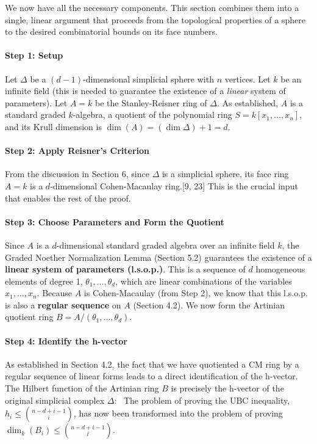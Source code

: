 \documentclass[11pt]{article}
\begin{document}
We now have all the necessary components. This section combines them into a single, linear argument that proceeds from the topological properties of a sphere to the desired combinatorial bounds on its face numbers.

\paragraph{Step 1: Setup}
Let $\Delta$ be a $(d-1)$-dimensional simplicial sphere with $n$ vertices. Let $k$ be an infinite field (this is needed to guarantee the existence of a \textit{linear} system of parameters). Let $A = k$ be the Stanley-Reisner ring of $\Delta$. As established, $A$ is a standard graded $k$-algebra, a quotient of the polynomial ring $S = k[x_1, \ldots, x_n]$, and its Krull dimension is $\dim(A) = (\dim \Delta) + 1 = d$.

\paragraph{Step 2: Apply Reisner's Criterion}
From the discussion in Section 6, since $\Delta$ is a simplicial sphere, its face ring $A = k$ is a $d$-dimensional Cohen-Macaulay ring.[9, 23] This is the crucial input that enables the rest of the proof.

\paragraph{Step 3: Choose Parameters and Form the Quotient}
Since $A$ is a $d$-dimensional standard graded algebra over an infinite field $k$, the Graded Noether Normalization Lemma (Section 5.2) guarantees the existence of a \textbf{linear system of parameters (l.s.o.p.)}. This is a sequence of $d$ homogeneous elements of degree 1, $\theta_1, \ldots, \theta_d$, which are linear combinations of the variables $x_1, \ldots, x_n$.
Because $A$ is Cohen-Macaulay (from Step 2), we know that this l.s.o.p. is also a \textbf{regular sequence} on $A$ (Section 4.2).
We now form the Artinian quotient ring $B = A / (\theta_1, \ldots, \theta_d)$.

\paragraph{Step 4: Identify the h-vector}
As established in Section 4.2, the fact that we have quotiented a CM ring by a regular sequence of linear forms leads to a direct identification of the h-vector. The Hilbert function of the Artinian ring $B$ is precisely the h-vector of the original simplicial complex $\Delta$:
\
The problem of proving the UBC inequality, $h_i \le \binom{n-d+i-1}{i}$, has now been transformed into the problem of proving $\dim_k(B_i) \le \binom{n-d+i-1}{i}$.
\end{document}

